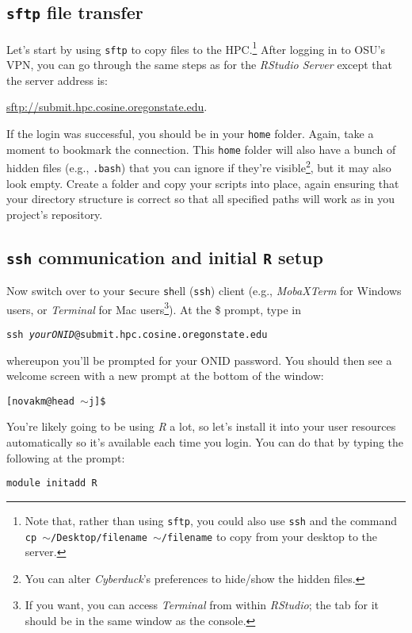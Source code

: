\documentclass[12pt,letterpaper]{article}
\begin{document}
\subsection{\texttt{sftp} file transfer}

Let's start by using \texttt{sftp} to copy files to the HPC.\footnote{Note that,
rather than using \texttt{sftp}, you could also use \texttt{ssh} and the command \texttt{cp $\sim$/Desktop/filename $\sim$/filename} to copy from your desktop to the server.}
After logging in to OSU's VPN, you can go through the same steps as for the \emph{RStudio Server}
except that the server address is:

\url{sftp://submit.hpc.cosine.oregonstate.edu}.

\noindent
If the login was successful, you should be in your \texttt{home} folder.
Again, take a moment to bookmark the connection.
This \texttt{home} folder will also have a bunch of hidden files (e.g., \texttt{.bash}) that you can ignore if
they're visible\footnote{You can alter \emph{Cyberduck}'s preferences to hide/show the hidden files.},
but it may also look empty.
Create a folder and copy your scripts into place, again ensuring that your directory structure is correct so that all specified paths will work as in you project's repository.

\subsection{\texttt{ssh} communication and initial \texttt{R} setup}
Now switch over to your \texttt{s}ecure \texttt{sh}ell (\texttt{ssh}) client (e.g., \emph{MobaXTerm} for Windows users, or \emph{Terminal} for Mac users\footnote{If you want, you can access \emph{Terminal} from within
\emph{RStudio}; the tab for it should be in the same window as the console.}).
At the \$ prompt, type in

\texttt{ssh \emph{yourONID}@submit.hpc.cosine.oregonstate.edu}

\noindent
whereupon you'll be prompted for your ONID password.
You should then see a welcome screen with a new prompt at the bottom of the window:

\texttt{[novakm@head $\sim$j]\$}

\noindent
You're likely going to be using \emph{R} a lot, so let's install it into your user resources automatically so it's available each time you login.
You can do that by typing the following at the prompt:

\texttt{module initadd R}
\end{document}
